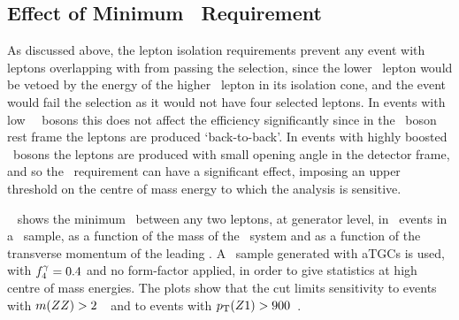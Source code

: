 \subsection{Effect of Minimum \deltaR\ Requirement}

As discussed above, the lepton isolation requirements prevent any event with
leptons overlapping with  from passing
the selection, since the lower \pt\ lepton would be vetoed by the
energy of the higher \pt\ lepton in its isolation cone, and the event would fail
the selection as it would not have four selected leptons. In events with low
\pt\ \Z\ bosons this does not affect the efficiency significantly since in the
\Z\ boson rest frame the leptons are produced `back-to-back'. In events with
highly boosted \Z\ bosons the leptons are produced with small opening angle in
the detector frame, and so the \deltaR\ requirement can have a significant
effect, imposing an upper threshold on the centre of mass energy to
which the analysis is sensitive.

~ shows the minimum \deltaR\ between any two leptons,
at generator level, in \fourlep\ events in a \mc\ sample, as a function of the
mass of the \fourlep\ system and as a function of the transverse momentum of the
leading \Z. A \ZZllll\ sample generated with aTGCs is used, with $f_{4}^{\gamma}=0.4$
and no form-factor applied, in order to give statistics at high centre of mass
energies. The plots show that the  cut limits sensitivity to
events with $m(ZZ)>2$~\tev\ and to events with $p_{\mathrm{T}}(Z1)>900$~\gev.

